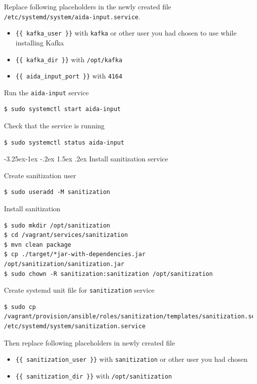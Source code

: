 \documentclass[a4paper]{article} %
\makeatletter
\renewcommand{\normalsize}{\fontsize{12}{15}\selectfont\color{textcolor}}
\renewcommand\subsubsection{\@startsection{subsubsection}{3}{\z@}%
                   {-3.25ex\@plus -1ex \@minus -.2ex}%
                   {1.5ex \@plus .2ex}%
                   {\normalfont\normalsize\sffamily\bfseries\color{projectcolor}}}
\makeatother
\begin{document}
Replace following placeholders in the newly created file \texttt{/etc/systemd/system/aida-input.service}.
\begin{itemize}
\item \texttt{\{\{ kafka\_user \}\}} with \texttt{kafka} or other user you had chosen to use while installing Kafka
\item \texttt{\{\{ kafka\_dir \}\}} with \texttt{/opt/kafka}
\item \texttt{\{\{ aida\_input\_port \}\}} with \texttt{4164}
\end{itemize}

Run the \texttt{aida-input} service
\begin{lstlisting}
$ sudo systemctl start aida-input
\end{lstlisting}

Check that the service is running
\begin{lstlisting}
$ sudo systemctl status aida-input
\end{lstlisting}


\subsubsection{Install sanitization service}

Create sanitization user
\begin{lstlisting}
$ sudo useradd -M sanitization
\end{lstlisting}

Install sanitization
\begin{lstlisting}
$ sudo mkdir /opt/sanitization
$ cd /vagrant/services/sanitization
$ mvn clean package
$ cp ./target/*jar-with-dependencies.jar /opt/sanitization/sanitization.jar
$ sudo chown -R sanitization:sanitization /opt/sanitization
\end{lstlisting}

Create systemd unit file for \texttt{sanitization} service
\begin{lstlisting}
$ sudo cp /vagrant/provision/ansible/roles/sanitization/templates/sanitization.service.j2 /etc/systemd/system/sanitization.service
\end{lstlisting}

Then replace following placeholders in newly created file
\begin{itemize}
\item \texttt{\{\{ sanitization\_user \}\}} with \texttt{sanitization} or other user you had chosen
\item \texttt{\{\{ sanitization\_dir \}\}} with \texttt{/opt/sanitization}
\end{itemize}
\end{document}
